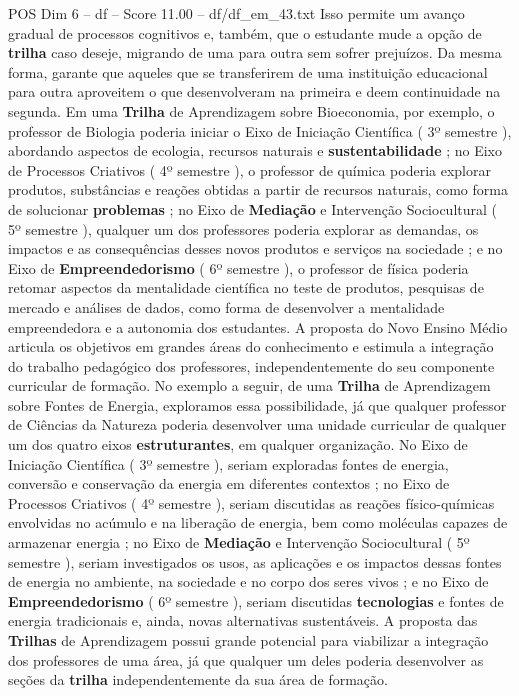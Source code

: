 \begin{textsample}{POS Dim 6 – df – Score 11.00 – df/df\_em\_43.txt}
Isso permite um avanço gradual de processos cognitivos e, também, que o estudante mude a opção de \textbf{trilha} caso deseje, migrando de uma para outra sem sofrer prejuízos.
Da mesma forma, garante que aqueles que se transferirem de uma instituição educacional para outra aproveitem o que desenvolveram na primeira e deem continuidade na segunda.
Em uma \textbf{Trilha} de Aprendizagem sobre Bioeconomia, por exemplo, o professor de Biologia poderia iniciar o Eixo de Iniciação Científica ( 3º semestre ), abordando aspectos de ecologia, recursos naturais e \textbf{sustentabilidade} ; no Eixo de Processos Criativos ( 4º semestre ), o professor de química poderia explorar produtos, substâncias e reações obtidas a partir de recursos naturais, como forma de solucionar \textbf{problemas} ; no Eixo de \textbf{Mediação} e Intervenção Sociocultural ( 5º semestre ), qualquer um dos professores poderia explorar as demandas, os impactos e as consequências desses novos produtos e serviços na sociedade ; e no Eixo de \textbf{Empreendedorismo} ( 6º semestre ), o professor de física poderia retomar aspectos da mentalidade científica no teste de produtos, pesquisas de mercado e análises de dados, como forma de desenvolver a mentalidade empreendedora e a autonomia dos estudantes.
A proposta do Novo Ensino Médio articula os objetivos em grandes áreas do conhecimento e estimula a integração do trabalho pedagógico dos professores, independentemente do seu componente curricular de formação.
No exemplo a seguir, de uma \textbf{Trilha} de Aprendizagem sobre Fontes de Energia, exploramos essa possibilidade, já que qualquer professor de Ciências da Natureza poderia desenvolver uma unidade curricular de qualquer um dos quatro eixos \textbf{estruturantes}, em qualquer organização.
No Eixo de Iniciação Científica ( 3º semestre ), seriam exploradas fontes de energia, conversão e conservação da energia em diferentes contextos ; no Eixo de Processos Criativos ( 4º semestre ), seriam discutidas as reações físico-químicas envolvidas no acúmulo e na liberação de energia, bem como moléculas capazes de armazenar energia ; no Eixo de \textbf{Mediação} e Intervenção Sociocultural ( 5º semestre ), seriam investigados os usos, as aplicações e os impactos dessas fontes de energia no ambiente, na sociedade e no corpo dos seres vivos ; e no Eixo de \textbf{Empreendedorismo} ( 6º semestre ), seriam discutidas \textbf{tecnologias} e fontes de energia tradicionais e, ainda, novas alternativas sustentáveis.
A proposta das \textbf{Trilhas} de Aprendizagem possui grande potencial para viabilizar a integração dos professores de uma área, já que qualquer um deles poderia desenvolver as seções da \textbf{trilha} independentemente da sua área de formação.

\end{textsample}
